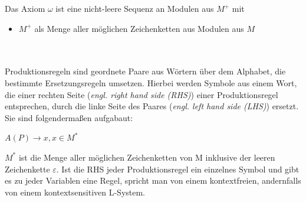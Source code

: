 \documentclass[11pt]{article}
\begin{document}
    Das Axiom $\omega$ ist eine nicht-leere Sequenz an Modulen aus $M^+$ mit
    \begin{itemize}
        \item $M^+$ als Menge aller möglichen Zeichenketten aus Modulen aus $M$
    \end{itemize}
    \\~\\
    Produktionsregeln sind geordnete Paare aus Wörtern über dem Alphabet, die bestimmte Ersetzungsregeln umsetzen. 
    Hierbei werden Symbole aus einem Wort, die einer rechten Seite (\textit{engl. right hand side (RHS)}) einer
    Produktionsregel entsprechen, durch die linke Seite des Paares (\textit{engl. left hand side (LHS)}) ersetzt.
    Sie sind folgendermaßen aufgabaut:
    \begin{center}
        $A(P)\rightarrow x,x\in M^*$
    \end{center}
    $M^*$ ist die Menge aller möglichen Zeichenketten von M inklusive der leeren Zeichenkette $\varepsilon$.
    Ist die RHS jeder Produktionsregel ein einzelnes Symbol und gibt es zu jeder Variablen eine Regel, spricht man
    von einem kontextfreien, andernfalls von einem kontextsensitiven L-System.
    
\end{document}
